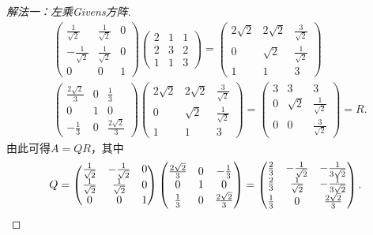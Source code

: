 \documentclass[a4paper,fontset=windows]{ctexbook}
\theoremstyle{definition}
\begin{document}
\begin{proof}[解法一：左乘Givens方阵]
\begin{align*}
&\begin{pmatrix}\frac{1}{\sqrt{2}}&\frac{1}{\sqrt{2}}&0 \\ -\frac{1}{\sqrt{2}}&\frac{1}{\sqrt{2}}&0 \\ 0&0&1\end{pmatrix}\begin{pmatrix}2&1&1 \\ 2&3&2 \\ 1&1&3\end{pmatrix}=\begin{pmatrix}2\sqrt{2}&2\sqrt{2}&\frac{3}{\sqrt{2}} \\ 0&\sqrt{2}&\frac{1}{\sqrt{2}} \\ 1&1&3\end{pmatrix} \\
&\begin{pmatrix}\frac{2\sqrt{2}}{3}&0&\frac{1}{3} \\ 0&1&0 \\ -\frac{1}{3}&0&\frac{2\sqrt{2}}{3}\end{pmatrix}\begin{pmatrix}2\sqrt{2}&2\sqrt{2}&\frac{3}{\sqrt{2}} \\ 0&\sqrt{2}&\frac{1}{\sqrt{2}} \\ 1&1&3\end{pmatrix}=\begin{pmatrix}3&3&3 \\ 0&\sqrt{2}&\frac{1}{\sqrt{2}} \\ 0&0&\frac{3}{\sqrt{2}}\end{pmatrix}=R.
\end{align*}
由此可得$A=QR$，其中
\begin{equation*}
Q=\begin{pmatrix}\frac{1}{\sqrt{2}}&-\frac{1}{\sqrt{2}}&0 \\ \frac{1}{\sqrt{2}}&\frac{1}{\sqrt{2}}&0 \\ 0&0&1\end{pmatrix}\begin{pmatrix}\frac{2\sqrt{2}}{3}&0&-\frac{1}{3} \\ 0&1&0 \\ \frac{1}{3}&0&\frac{2\sqrt{2}}{3}\end{pmatrix}=\begin{pmatrix}\frac{2}{3}&-\frac{1}{\sqrt{2}}&-\frac{1}{3\sqrt{2}} \\ \frac{2}{3}&\frac{1}{\sqrt{2}}&-\frac{1}{3\sqrt{2}} \\ \frac{1}{3}&0&\frac{2\sqrt{2}}{3}\end{pmatrix}.\qedhere
\end{equation*}
\end{proof}
\end{document}
